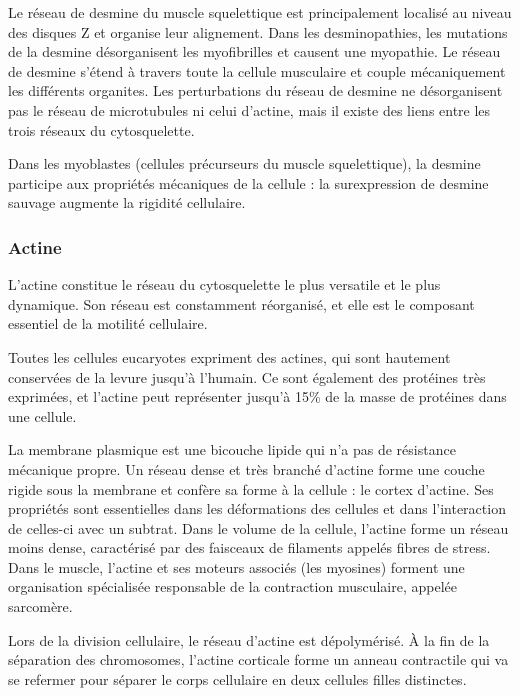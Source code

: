\documentclass{report}
\begin{document}
Le réseau de desmine du muscle squelettique est principalement localisé au niveau des disques Z et organise leur alignement. Dans les desminopathies, les mutations de la desmine désorganisent les myofibrilles et causent une myopathie. 
Le réseau de desmine s'étend à travers toute la cellule musculaire et couple mécaniquement les différents organites. 
Les perturbations du réseau de desmine ne désorganisent pas le réseau de microtubules ni celui d'actine, mais il existe des liens entre les trois réseaux du cytosquelette. 

Dans les myoblastes (cellules précurseurs du muscle squelettique), la desmine participe aux propriétés mécaniques de la cellule : la surexpression de desmine sauvage augmente la rigidité cellulaire. 





\subsubsection{Actine}
  
L'actine constitue le réseau du cytosquelette le plus versatile et le plus dynamique. Son réseau est constamment réorganisé, et elle est le composant essentiel de la motilité cellulaire. 

Toutes les cellules eucaryotes expriment des actines, qui sont hautement conservées de la levure jusqu'à l'humain. Ce sont également des protéines très exprimées, et l'actine peut représenter jusqu'à 15\% de la masse de protéines dans une cellule. 

La membrane plasmique est une bicouche lipide qui n'a pas de résistance mécanique propre. Un réseau dense et très branché d'actine forme une couche rigide sous la membrane et confère sa forme à la cellule : le cortex d'actine. Ses propriétés sont essentielles dans les déformations des cellules et dans l'interaction de celles-ci avec un subtrat. 
Dans le volume de la cellule, l'actine forme un réseau moins dense, caractérisé par des faisceaux de filaments appelés fibres de stress. 
Dans le muscle, l'actine et ses moteurs associés (les myosines) forment une organisation spécialisée responsable de la contraction musculaire, appelée sarcomère. 

Lors de la division cellulaire, le réseau d'actine est dépolymérisé. À la fin de la séparation des chromosomes, l'actine corticale forme un anneau contractile qui va se refermer pour séparer le corps cellulaire en deux cellules filles distinctes. 
\end{document}

